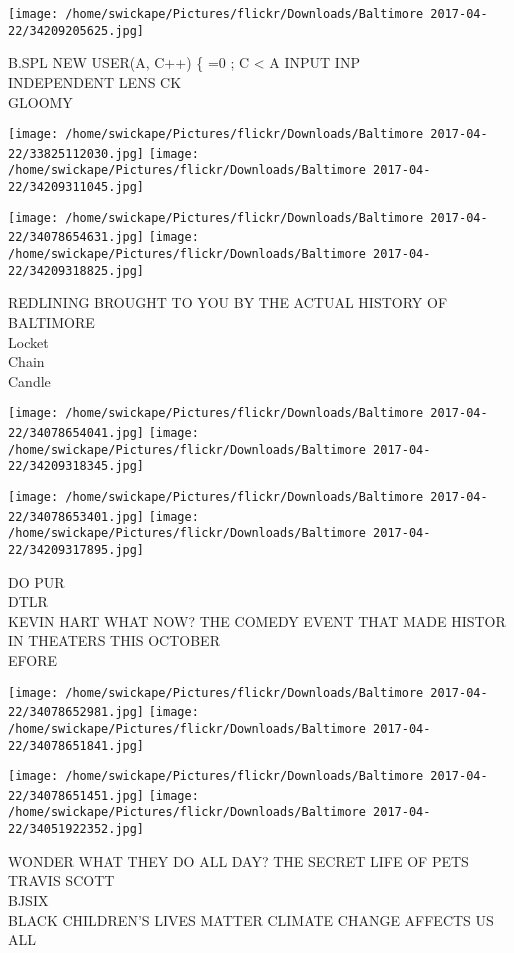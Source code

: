 \documentclass[10pt,letterpaper]{article}
\begin{document}
\vspace{0.25in}
\texttt{[image: /home/swickape/Pictures/flickr/Downloads/Baltimore 2017-04-22/34209205625.jpg]}

B.SPL NEW USER(A,  C++)  \{   =0 ; C < A INPUT INP\\
INDEPENDENT LENS CK\\
GLOOMY
\pagebreak

\texttt{[image: /home/swickape/Pictures/flickr/Downloads/Baltimore 2017-04-22/33825112030.jpg]}
\texttt{[image: /home/swickape/Pictures/flickr/Downloads/Baltimore 2017-04-22/34209311045.jpg]}

\texttt{[image: /home/swickape/Pictures/flickr/Downloads/Baltimore 2017-04-22/34078654631.jpg]}
\texttt{[image: /home/swickape/Pictures/flickr/Downloads/Baltimore 2017-04-22/34209318825.jpg]}

REDLINING BROUGHT TO YOU BY THE ACTUAL HISTORY OF BALTIMORE\\
Locket\\
Chain\\
Candle
\pagebreak

\texttt{[image: /home/swickape/Pictures/flickr/Downloads/Baltimore 2017-04-22/34078654041.jpg]}
\texttt{[image: /home/swickape/Pictures/flickr/Downloads/Baltimore 2017-04-22/34209318345.jpg]}

\texttt{[image: /home/swickape/Pictures/flickr/Downloads/Baltimore 2017-04-22/34078653401.jpg]}
\texttt{[image: /home/swickape/Pictures/flickr/Downloads/Baltimore 2017-04-22/34209317895.jpg]}

DO PUR\\
DTLR\\
KEVIN HART WHAT NOW?  THE COMEDY EVENT THAT MADE HISTOR IN THEATERS THIS OCTOBER\\
EFORE
\pagebreak

\texttt{[image: /home/swickape/Pictures/flickr/Downloads/Baltimore 2017-04-22/34078652981.jpg]}
\texttt{[image: /home/swickape/Pictures/flickr/Downloads/Baltimore 2017-04-22/34078651841.jpg]}

\texttt{[image: /home/swickape/Pictures/flickr/Downloads/Baltimore 2017-04-22/34078651451.jpg]}
\texttt{[image: /home/swickape/Pictures/flickr/Downloads/Baltimore 2017-04-22/34051922352.jpg]}

WONDER WHAT THEY DO ALL DAY?  THE SECRET LIFE OF PETS\\
TRAVIS SCOTT\\
BJSIX\\
BLACK CHILDREN'S LIVES MATTER CLIMATE CHANGE AFFECTS US ALL
\pagebreak
\end{document}
